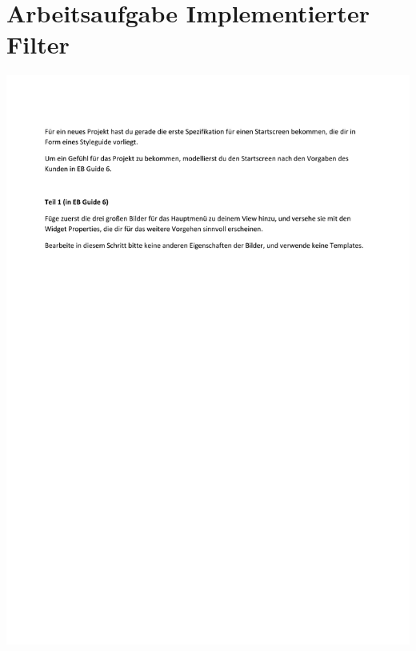 \chapter{Arbeitsaufgabe Implementierter Filter}\label{app:Aufgabe_Filter}
\begin{center}
  \includegraphics[scale=0.9]{supplement/Arbeitsaufgabe_Prototyp_Teil1.pdf}
\end{center}

